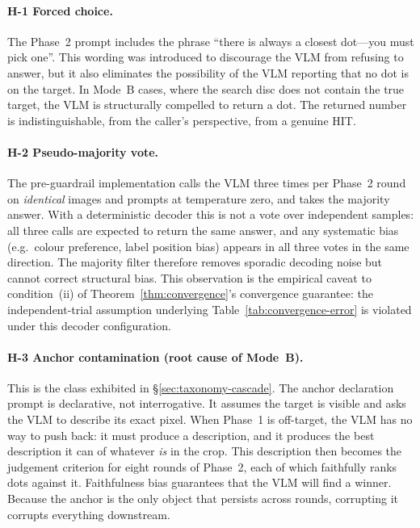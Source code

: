 \paragraph{H-1 Forced choice.}
The Phase~2 prompt includes the phrase ``there is always a closest
dot---you must pick one''.  This wording was introduced to discourage
the VLM from refusing to answer, but it also eliminates the
possibility of the VLM reporting that no dot is on the target.  In
Mode~B cases, where the search disc does not contain the true target,
the VLM is structurally compelled to return a dot.  The returned
number is indistinguishable, from the caller's perspective, from a
genuine HIT.

\paragraph{H-2 Pseudo-majority vote.}
\label{par:h2-pseudo-majority}
The pre-guardrail implementation calls the VLM three times per Phase~2 round on
\emph{identical} images and prompts at temperature zero, and takes
the majority answer.  With a deterministic decoder this is not a vote
over independent samples: all three calls are expected to return the
same answer, and any systematic bias (e.g.\ colour preference, label
position bias) appears in all three votes in the same direction.  The
majority filter therefore removes sporadic decoding noise but cannot
correct structural bias.  This observation is the empirical caveat to
condition~(ii) of Theorem~\ref{thm:convergence}'s convergence
guarantee: the independent-trial assumption underlying
Table~\ref{tab:convergence-error} is violated under this decoder
configuration.

\paragraph{H-3 Anchor contamination (root cause of Mode~B).}
This is the class exhibited in §\ref{sec:taxonomy-cascade}.  The
anchor declaration prompt is declarative, not interrogative.  It
assumes the target is visible and asks the VLM to describe its exact
pixel.  When Phase~1 is off-target, the VLM has no way to push back:
it must produce a description, and it produces the best description
it can of whatever \emph{is} in the crop.  This description then
becomes the judgement criterion for eight rounds of Phase~2, each of
which faithfully ranks dots against it.  Faithfulness bias
\cite{kadavath2022language} guarantees that the VLM will find a
winner.  Because the anchor is the only object that persists across
rounds, corrupting it corrupts everything downstream.

